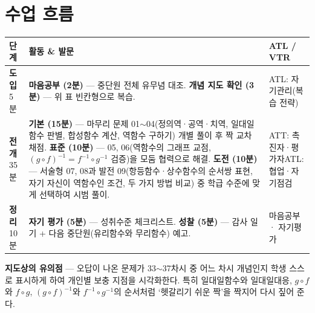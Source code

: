 \documentclass[11pt,a4paper]{article}
\begin{document}
\section{수업 흐름}
\begin{tabularx}{\linewidth}{@{}>{\centering\arraybackslash}p{1.6cm}X>{\raggedright\arraybackslash\small}p{3.1cm}@{}}
\toprule
\textbf{단계} & \textbf{활동 \& 발문} & \textbf{ATL / VTR} \\
\midrule
\textcolor{goldstrong}{\textbf{도입}}\newline\footnotesize 5분 &
\textbf{마음공부 (2분)} --- 중단원 전체 유무념 대조.\newline
\textbf{개념 지도 확인 (3분)} --- 위 표 빈칸형으로 복습. &
ATL: 자기관리(복습 전략) \\
\addlinespace
\textcolor{goldstrong}{\textbf{전개}}\newline\footnotesize 35분 &
\textbf{기본 (15분)} --- 마무리 문제 01$\sim$04(정의역·공역·치역, 일대일함수 판별, 합성함수 계산, 역함수 구하기) 개별 풀이 후 짝 교차 채점.\newline
\textbf{표준 (10분)} --- 05, 06(역함수의 그래프 교점, $(g\circ f)^{-1}=f^{-1}\circ g^{-1}$ 검증)을 모둠 협력으로 해결.\newline
\textbf{도전 (10분)} --- 서술형 07, 08과 발전 09(항등함수·상수함수의 순서쌍 표현, 자기 자신이 역함수인 조건, 두 가지 방법 비교) 중 학급 수준에 맞게 선택하여 시범 풀이. &
ATT: 촉진자·평가자\newline ATL: 협업·자기점검 \\
\addlinespace
\textcolor{goldstrong}{\textbf{정리}}\newline\footnotesize 10분 &
\textbf{자기 평가 (5분)} --- 성취수준 체크리스트.\newline
\textbf{성찰 (5분)} --- 감사 일기 + 다음 중단원(유리함수와 무리함수) 예고. &
마음공부 · 자기평가 \\
\bottomrule
\end{tabularx}

\begin{calloutbox}
\textbf{지도상의 유의점} --- 오답이 나온 문제가 33$\sim$37차시 중 어느 차시 개념인지 학생 스스로 표시하게 하여 개인별 보충 지점을 시각화한다. 특히 일대일함수와 일대일대응, $g\circ f$와 $f\circ g$, $(g\circ f)^{-1}$와 $f^{-1}\circ g^{-1}$의 순서처럼 `헷갈리기 쉬운 짝'을 짝지어 다시 짚어 준다.
\end{calloutbox}
\end{document}

